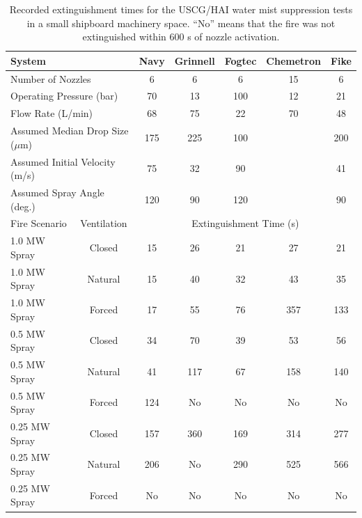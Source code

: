 \begin{table}[h!]
\caption[USCG/HAI water mist suppression extinguishment times]{Recorded extinguishment times for the USCG/HAI water mist suppression tests in a small shipboard machinery space. ``No''
means that the fire was not extinguished within 600 s of nozzle activation.}
\begin{center}
\begin{tabular}{|l|c|c|c|c|c|c|}
\hline
\multicolumn{2}{|l|}{System}                            & Navy  & Grinnell  & Fogtec    & Chemetron & Fike   \\ \hline  \hline
\multicolumn{2}{|l|}{Number of Nozzles}                 & 6     & 6         & 6         & 15        & 6      \\ \hline
\multicolumn{2}{|l|}{Operating Pressure (bar)}          & 70    & 13        & 100       & 12        & 21     \\ \hline
\multicolumn{2}{|l|}{Flow Rate (L/min)}                 & 68    & 75        & 22        & 70        & 48     \\ \hline
\multicolumn{2}{|l|}{Assumed Median Drop Size ($\mu$m)} & 175   & 225       & 100       &           & 200    \\ \hline
\multicolumn{2}{|l|}{Assumed Initial Velocity (m/s)}    & 75    & 32        & 90        &           & 41     \\ \hline
\multicolumn{2}{|l|}{Assumed Spray Angle (deg.)}        & 120   & 90        & 120       &           & 90     \\ \hline \hline
Fire Scenario       & Ventilation                       & \multicolumn{5}{c|}{Extinguishment Time (s)}      \\ \hline \hline
1.0 MW Spray        & Closed                            & 15    & 26        & 21        & 27        & 21     \\ \hline
1.0 MW Spray        & Natural                           & 15    & 40        & 32        & 43        & 35     \\ \hline
1.0 MW Spray        & Forced                            & 17    & 55        & 76        & 357       & 133    \\ \hline
0.5 MW Spray        & Closed                            & 34    & 70        & 39        & 53        & 56     \\ \hline
0.5 MW Spray        & Natural                           & 41    & 117       & 67        & 158       & 140    \\ \hline
0.5 MW Spray        & Forced                            & 124   & No        & No        & No        & No     \\ \hline
0.25 MW Spray       & Closed                            & 157   & 360       & 169       & 314       & 277    \\ \hline
0.25 MW Spray       & Natural                           & 206   & No        & 290       & 525       & 566    \\ \hline
0.25 MW Spray       & Forced                            & No    & No        & No        & No        & No     \\ \hline
\end{tabular}
\end{center}
\label{USCG_HAI_Times}
\end{table}
